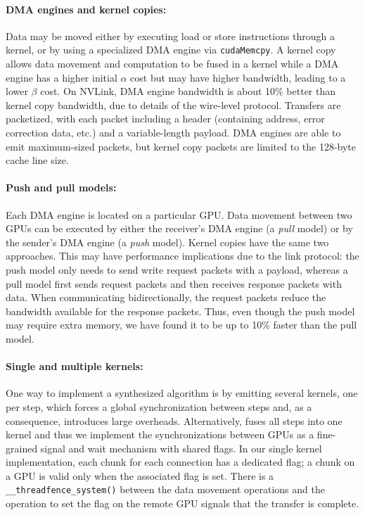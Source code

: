 \paragraph{DMA engines and kernel copies:} Data may be moved either by
executing load or store instructions through a kernel, or by using a
specialized DMA engine via \texttt{cudaMemcpy}. A kernel copy allows
data movement and computation to be fused in a kernel while a DMA
engine has a higher initial $\alpha$ cost but may have higher
bandwidth, leading to a lower $\beta$ cost. On NVLink, DMA engine
bandwidth is about 10\% better than kernel copy bandwidth, due to
details of the wire-level protocol. Transfers are packetized, with
each packet including a header (containing address, error correction
data, etc.) and a variable-length payload. DMA engines are able to
emit maximum-sized packets, but kernel copy packets are limited to the
128-byte cache line size.

\paragraph{Push and pull models:} Each DMA engine is located on a
particular GPU. Data movement between two GPUs can be executed by
either the receiver's DMA engine (a {\em pull} model) or by the
sender's DMA engine (a {\em push} model). Kernel copies have the same
two approaches. This may have performance implications due to the link
protocol: the push model only needs to send write request packets with
a payload, whereas a pull model first sends request packets and then
receives response packets with data. When communicating
bidirectionally, the request packets reduce the bandwidth available
for the response packets. Thus, even though the push model may require
extra memory, we have found it to be up to 10\% faster than the pull
model.



\paragraph{Single and multiple kernels:} One way to implement a
synthesized algorithm is by emitting several kernels, one per step,
which forces a global synchronization between steps and, as a
consequence, introduces large overheads. Alternatively, \tool{} fuses
all steps into one kernel and thus we implement the synchronizations
between GPUs as a fine-grained signal and wait mechanism with shared
flags. In our single kernel implementation, each chunk for each
connection has a dedicated flag; a chunk on a GPU is valid only when
the associated flag is set. There is a
\texttt{\_\_threadfence\_system()} between the data movement
operations and the operation to set the flag on the remote GPU signals
that the transfer is complete.

